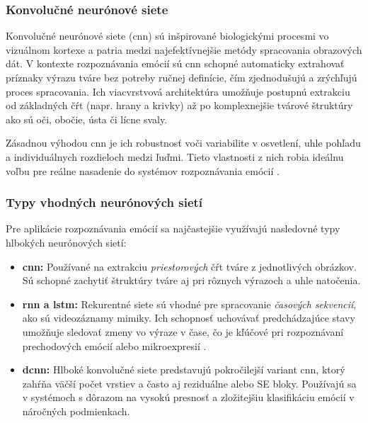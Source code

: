 \subsubsection{Konvolučné neurónové siete}

Konvolučné neurónové siete (\gls{cnn}) sú inšpirované biologickými procesmi vo vizuálnom kortexe a patria medzi najefektívnejšie metódy spracovania obrazových dát. V kontexte rozpoznávania emócií sú \gls{cnn} schopné automaticky extrahovať príznaky výrazu tváre bez potreby ručnej definície, čím zjednodušujú a zrýchľujú proces spracovania. Ich viacvrstvová architektúra umožňuje postupnú extrakciu od základných čŕt (napr. hrany a krivky) až po komplexnejšie tvárové štruktúry ako sú oči, obočie, ústa či lícne svaly.

Zásadnou výhodou \gls{cnn} je ich robustnosť voči variabilite v osvetlení, uhle pohľadu a individuálnych rozdieloch medzi ľuďmi. Tieto vlastnosti z nich robia ideálnu voľbu pre reálne nasadenie do systémov rozpoznávania emócií \cite{article05}.

\subsubsection{Typy vhodných neurónových sietí}

Pre aplikácie rozpoznávania emócií sa najčastejšie využívajú nasledovné typy hlbokých neurónových sietí:

\begin{itemize}
    \item \textbf{\gls{cnn}:} Používané na extrakciu \textit{priestorových} čŕt tváre z jednotlivých obrázkov. Sú schopné zachytiť štruktúry tváre aj pri rôznych výrazoch a uhle natočenia.
    
    \item \textbf{\gls{rnn} a \gls{lstm}:} Rekurentné siete sú vhodné pre spracovanie \textit{časových sekvencií}, ako sú videozáznamy mimiky. Ich schopnosť uchovávať predchádzajúce stavy umožňuje sledovať zmeny vo výraze v čase, čo je kľúčové pri rozpoznávaní prechodových emócií alebo mikroexpresií \cite{article02}.
    
    \item \textbf{\gls{dcnn}:} Hlboké konvolučné siete predstavujú pokročilejší variant \gls{cnn}, ktorý zahŕňa väčší počet vrstiev a často aj reziduálne alebo SE bloky. Používajú sa v systémoch s dôrazom na vysokú presnosť a zložitejšiu klasifikáciu emócií v náročných podmienkach.
\end{itemize}

